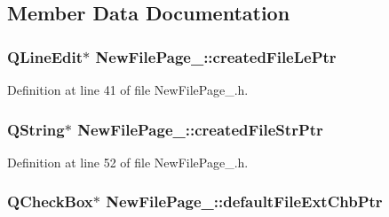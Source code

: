 \subsection{Member Data Documentation}
\hypertarget{class_new_file_page__4_a34ae0bfeb34f323cc34ae16a9df9ce28}{
\subsubsection[{created\-File\-Le\-Ptr}]{\setlength{\rightskip}{0pt plus 5cm}Q\-Line\-Edit$\ast$ New\-File\-Page\-\_\-::created\-File\-Le\-Ptr\hspace{0.3cm}{\ttfamily [private]}}}\label{class_new_file_page__4_a34ae0bfeb34f323cc34ae16a9df9ce28}


Definition at line 41 of file New\-File\-Page\-\_.\-h.

\hypertarget{class_new_file_page__4_a40a59859a2576f2fdbddc4218f96d472}{
\subsubsection[{created\-File\-Str\-Ptr}]{\setlength{\rightskip}{0pt plus 5cm}Q\-String$\ast$ New\-File\-Page\-\_\-::created\-File\-Str\-Ptr\hspace{0.3cm}{\ttfamily [private]}}}\label{class_new_file_page__4_a40a59859a2576f2fdbddc4218f96d472}


Definition at line 52 of file New\-File\-Page\-\_.\-h.

\hypertarget{class_new_file_page__4_a3d192a050512836a080dab3b1cdf3387}{
\subsubsection[{default\-File\-Ext\-Chb\-Ptr}]{\setlength{\rightskip}{0pt plus 5cm}Q\-Check\-Box$\ast$ New\-File\-Page\-\_\-::default\-File\-Ext\-Chb\-Ptr\hspace{0.3cm}{\ttfamily [private]}}}\label{class_new_file_page__4_a3d192a050512836a080dab3b1cdf3387}


